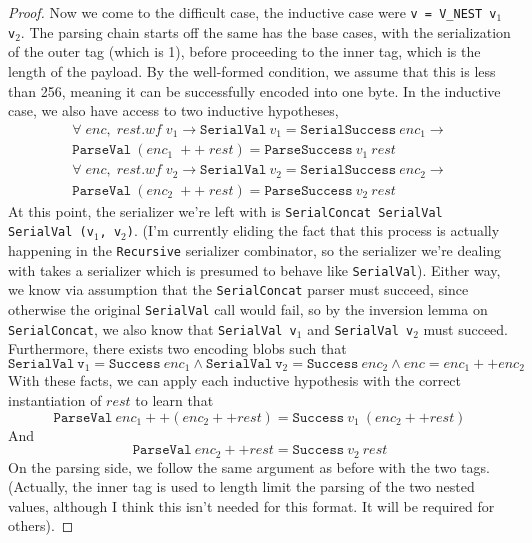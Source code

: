 \begin{proof}
  Now we come to the difficult case, the inductive case were \texttt{v = V\_NEST
    v$_1$ v$_2$}. The parsing chain starts off the same has the base cases, with
  the serialization of the outer tag (which is 1), before proceeding to the
  inner tag, which is the length of the payload. By the well-formed condition,
  we assume that this is less than 256, meaning it can be successfully encoded
  into one byte. In the inductive case, we also have access to two inductive
  hypotheses, 
  \begin{multline*}
    \forall\;enc,\;rest. wf\;v_1 \rightarrow \mathtt{SerialVal}\ v_1 =
    \mathtt{SerialSuccess}\ enc_1 \rightarrow \\
    \mathtt{ParseVal}\ (enc_1\;++\;rest) = \mathtt{ParseSuccess}\ v_1\ rest
    \tag{IH$_1$}
  \end{multline*}
  \begin{multline*}
    \forall\;enc,\;rest. wf\;v_2 \rightarrow \mathtt{SerialVal}\ v_2 =
    \mathtt{SerialSuccess}\ enc_2 \rightarrow \\
    \mathtt{ParseVal}\ (enc_2\;++\;rest) = \mathtt{ParseSuccess}\ v_2\ rest
    \tag{IH$_2$}
  \end{multline*}
  At this point, the serializer we're left with is \texttt{SerialConcat
    SerialVal SerialVal (v$_1$, v$_2$)}. (I'm currently eliding the fact that
  this process is actually happening in the \texttt{Recursive} serializer
  combinator, so the serializer we're dealing with takes a serializer which is
  presumed to behave like \texttt{SerialVal}). Either way, we know via
  assumption that the \texttt{SerialConcat} parser must succeed, since otherwise
  the original \texttt{SerialVal} call would fail, so by the inversion lemma on
  \texttt{SerialConcat}, we also know that \texttt{SerialVal v$_1$} and
  \texttt{SerialVal v$_2$} must succeed. Furthermore, there exists two encoding
  blobs such that
  \[ \mathtt{SerialVal}\ \mathtt{v}_1 = \mathtt{Success}\ enc_1 \wedge
    \mathtt{SerialVal}\ \mathtt{v}_2 = \mathtt{Success}\ enc_2 \wedge enc = enc_1 ++
    enc_2 \]
  With these facts, we can apply each inductive hypothesis with the correct
  instantiation of $rest$ to learn that 
  \[ \mathtt{ParseVal}\ enc_1 ++ (enc_2 ++ rest) = \mathtt{Success}\ v_1\
    (enc_2 ++ rest) \]
  And 
  \[ \mathtt{ParseVal}\ enc_2 ++ rest = \mathtt{Success}\ v_2\ rest \]
  On the parsing side, we follow the same argument as before with the two tags.
  (Actually, the inner tag is used to length limit the parsing of the two nested
  values, although I think this isn't needed for this format. It will be
  required for others).


\end{proof}
